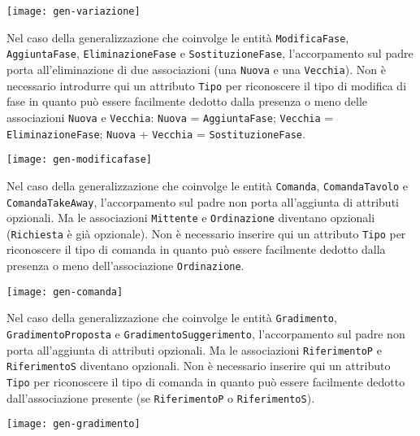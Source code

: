 \vspace{5pt}\centerline{\texttt{[image: gen-variazione]}}

\vspace{15pt}

Nel caso della generalizzazione che coinvolge le entità {\tt ModificaFase}, {\tt AggiuntaFase},
{\tt EliminazioneFase} e {\tt SostituzioneFase}, l'accorpamento sul padre porta all'eliminazione
di due associazioni (una {\tt Nuova} e una {\tt Vecchia}). Non è necessario introdurre qui un
attributo {\tt Tipo} per riconoscere il tipo di modifica di fase in quanto può essere facilmente
dedotto dalla presenza o meno delle associazioni {\tt Nuova} e {\tt Vecchia}: {\tt Nuova} = {\tt AggiuntaFase};
{\tt Vecchia} = {\tt EliminazioneFase}; {\tt Nuova} + {\tt Vecchia} = {\tt SostituzioneFase}.

\vspace{5pt}\centerline{\texttt{[image: gen-modificafase]}}

\vspace{15pt}

Nel caso della generalizzazione che coinvolge le entità {\tt Comanda}, {\tt ComandaTavolo}
e {\tt ComandaTakeAway}, l'accorpamento sul padre non porta all'aggiunta di attributi opzionali.
Ma le associazioni {\tt Mittente} e {\tt Ordinazione} diventano opzionali ({\tt Richiesta} è
già opzionale). Non è necessario inserire qui un attributo {\tt Tipo} per riconoscere
il tipo di comanda in quanto può essere facilmente dedotto dalla presenza o meno
dell'associazione {\tt Ordinazione}.

\vspace{5pt}\centerline{\texttt{[image: gen-comanda]}}

\vspace{15pt}

Nel caso della generalizzazione che coinvolge le entità {\tt Gradimento}, {\tt GradimentoProposta}
e {\tt GradimentoSuggerimento}, l'accorpamento sul padre non porta all'aggiunta di attributi opzionali.
Ma le associazioni {\tt RiferimentoP} e {\tt RiferimentoS} diventano opzionali.
Non è necessario inserire qui un attributo {\tt Tipo} per riconoscere il tipo di
comanda in quanto può essere facilmente dedotto dall'associazione presente (se
{\tt RiferimentoP} o {\tt RiferimentoS}).

\vspace{5pt}\centerline{\texttt{[image: gen-gradimento]}}

\vspace{15pt}

